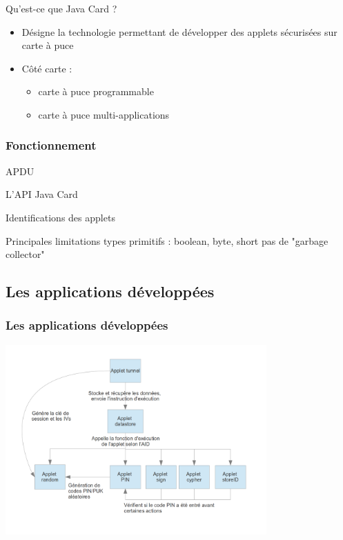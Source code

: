 \documentclass{beamer}
\begin{document}
\begin{frame}
    \begin{block}{Qu'est-ce que Java Card ?}
        \begin{itemize}
            \item Désigne la technologie permettant de développer
                des applets \og sécurisées \fg{} sur carte à puce 

            \item Côté carte : 
                \begin{itemize}
                    \item carte à puce programmable 
                    \item carte à puce multi-applications
                \end{itemize}
        \end{itemize}
    \end{block}
\end{frame}

\begin{frame}
    \frametitle{Fonctionnement}
    \begin{block}{APDU}
    \end{block}
    \begin{block}{L'API Java Card }
    \end{block}
    \begin{block}{Identifications des applets}
    \end{block}
\end{frame}

\begin{frame}
    \begin{block}{Principales limitations}
        types primitifs : boolean, byte, short
        pas de "garbage collector"

    \end{block}
\end{frame}

\subsection{Les applications développées}
\begin{frame}
    \frametitle{Les applications développées}
    \includegraphics[width=10cm]{graphe_dep}
    \begin{block}{}
    \end{block}
\end{frame}
\end{document}
